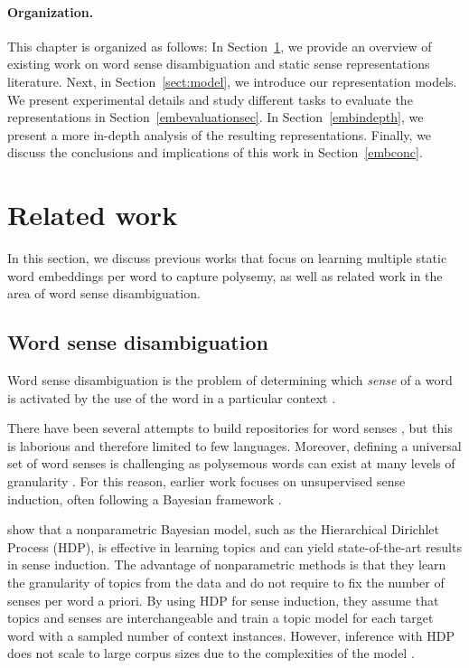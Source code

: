 \paragraph{Organization.} This chapter is organized as follows: In Section~\ref{toprel}, we provide an overview of existing work on word sense disambiguation and static sense representations literature. 
Next, in Section~\ref{sect:model}, we introduce our representation models.
We present experimental details and study different tasks to evaluate the representations in Section~\ref{embevaluationsec}.
In Section~\ref{embindepth}, we present a more in-depth analysis of the resulting representations. 
Finally, we discuss the conclusions and implications of this work in Section~\ref{embconc}. 

\section{Related work}\label{toprel}

In this section, we discuss previous works that focus on learning multiple static word embeddings per word to capture polysemy, as well as related work in the area of word sense disambiguation. 

\subsection{Word sense disambiguation}
Word sense disambiguation is the problem of determining which \textit{sense} of a word is activated by the use of the word in a particular context \citep{ide-veronis-1998-introduction}. 

There have been several attempts to build repositories for word senses \citep{miller1995wordnet,navigli2010babelnet}, but this is laborious and therefore limited to few languages. Moreover, defining a universal set of word senses is challenging as polysemous words can exist at many levels of granularity \citep{journals/lre/Kilgarriff97,Navigli2012}. 
For this reason, earlier work focuses on unsupervised sense induction, often following a Bayesian framework \citep{brody-lapata:2009:EACL,lau2014learning}. 

\citet{yao2011nonparametric} show that a nonparametric Bayesian model, such as the Hierarchical Dirichlet Process (HDP), is effective in learning topics and can yield state-of-the-art results in sense induction. 
The advantage of nonparametric methods is that they learn the granularity of topics from the data and do not require to fix the number of senses per word a priori.
By using HDP for sense induction, they assume that topics and senses are interchangeable and train a topic model for each target word with a sampled number of context instances.
However, inference with HDP does not scale to large corpus sizes due to the complexities of the model \citep{Jordan2011THEEO,6802355}.

